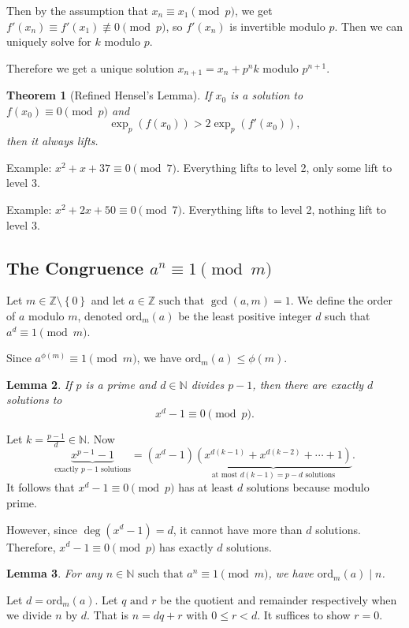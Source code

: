 \documentclass[11pt]{article}
\newtheorem{thm}{Theorem}[section]
\newtheorem{lemma}[thm]{Lemma}
\theoremstyle{definition}
\newcommand{\The}[2]{\begin{#1}#2\end{#1}}
\newcommand{\ord}[0]{\text{ord}}
\newcommand{\sm}[0]{\setminus}
\newcommand{\set}[1]{\left\{ #1 \right\}}
\newcommand{\st}[0]{\text{ such that }}
\newcommand{\et}[0]{\text{ and }}
\newcommand{\ZZ}{\mathbb{Z}}
\newcommand{\NN}{\mathbb{N}}
\begin{document}
Then by the assumption that $x_n \equiv x_1 \pmod{p}$, we get $f'(x_n) \equiv f'(x_1) \not\equiv 0 \pmod{p}$, so $f'(x_n)$ is invertible modulo $p$. Then we can uniquely solve for $k$ modulo $p$. 

Therefore we get a unique solution $x_{n+1} = x_n + p^n k$ modulo $p^{n+1}$.
\qedhere

\begin{thm}[Refined Hensel's Lemma]
	If $x_0$ is a solution to $f(x_0) \equiv 0 \pmod{p}$ and 
	$$\exp_p(f(x_0)) > 2\exp_p(f'(x_0)),$$
	then it always lifts.
\end{thm}

Example: $x^2 + x + 37 \equiv 0 \pmod{7}$. 
Everything lifts to level 2, only some lift to level 3.

Example: $x^2 + 2x + 50 \equiv 0 \pmod{7}$. 
Everything lifts to level 2, nothing lift to level 3. 


\subsection{The Congruence $a^n \equiv 1 \pmod{m}$} 
\The{defn} {
	Let $m\in\ZZ\sm\set{0}$ and let $a\in\ZZ \st \gcd(a,m)=1$. We define the order of $a$ modulo $m$, denoted $\ord_m(a)$ be the least positive integer $d$ such that $a^d \equiv 1 \pmod{m}$. 
}
Since $a^{\phi(m)} \equiv 1 \pmod{m}$, we have $\ord_m(a) \le \phi(m)$. 

\begin{lemma}
	If $p$ is a prime and $d\in\NN$ divides $p-1$, then there are exactly $d$ solutions to 
	$$ x^d - 1 \equiv 0 \pmod{p}. $$
\end{lemma}
\proof
Let $k = \frac{p-1}{d} \in\NN$. Now 
$$\underbrace{x^{p-1}-1}_{\text{exactly } p-1 \text{ solutions}} 
	= (x^d-1)\underbrace{(x^{d(k-1)} + x^{d(k-2)} + \cdots + 1)}_{\text{at most } d(k-1)=p-d \text{ solutions}}. $$
It follows that $x^d-1\equiv0\pmod{p}$ has at least $d$ solutions because modulo prime. 

However, since $\deg(x^d-1) = d$, it cannot have more than $d$ solutions. 
Therefore, $x^d-1\equiv0\pmod{p}$ has exactly $d$ solutions.
\qedhere

\begin{lemma}
	For any $n\in\NN \st a^n\equiv1\pmod{m}$, we have $\ord_m(a)\mid n$. 
\end{lemma}
\proof
Let $d = \ord_m(a)$.
Let $q\et r$ be the quotient and remainder respectively when we divide $n$ by $d$. 
That is $n = dq+r$ with $0\le r < d$. It suffices to show $r=0$. 
\end{document}
